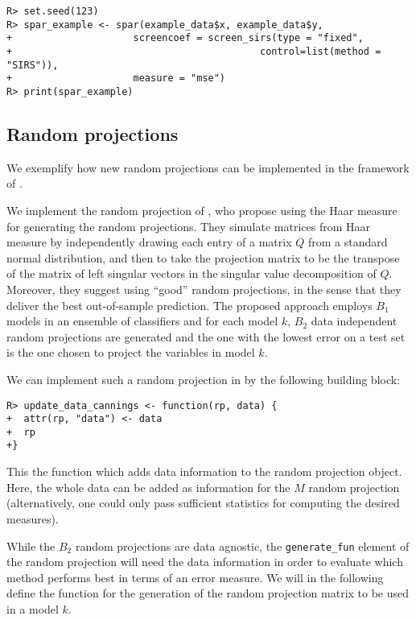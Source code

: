 \documentclass[
  article]{jss}
\begin{document}
\begin{verbatim}
R> set.seed(123)      
R> spar_example <- spar(example_data$x, example_data$y,
+                     screencoef = screen_sirs(type = "fixed",
+                                           control=list(method = "SIRS")),
+                     measure = "mse")
R> print(spar_example)
\end{verbatim}

\subsection{Random projections}\label{random-projections-1}

We exemplify how new random projections can be implemented in the
framework of .

We implement the random projection of \citet{cannings2017random}, who
propose using the Haar measure for generating the random projections.
They simulate matrices from Haar measure by independently drawing each
entry of a matrix \(Q\) from a standard normal distribution, and then to
take the projection matrix to be the transpose of the matrix of left
singular vectors in the singular value decomposition of \(Q\). Moreover,
they suggest using ``good'' random projections, in the sense that they
deliver the best out-of-sample prediction. The proposed approach employs
\(B_1\) models in an ensemble of classifiers and for each model \(k\),
\(B_2\) data independent random projections are generated and the one
with the lowest error on a test set is the one chosen to project the
variables in model \(k\).

We can implement such a random projection in  by the following
building block:

\begin{verbatim}
R> update_data_cannings <- function(rp, data) {
+  attr(rp, "data") <- data
+  rp
+}
\end{verbatim}

This the function which adds data information to the random projection
object. Here, the whole data can be added as information for the \(M\)
random projection (alternatively, one could only pass sufficient
statistics for computing the desired measures).

While the \(B_2\) random projections are data agnostic, the
\texttt{generate\_fun} element of the random projection will need the
data information in order to evaluate which method performs best in
terms of an error measure. We will in the following define the function
for the generation of the random projection matrix to be used in a model
\(k\).
\end{document}
